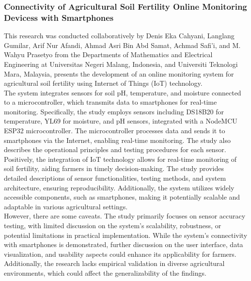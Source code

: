 \documentclass[12pt, a4paper]{article}
\begin{document}
\subsubsection{Connectivity of Agricultural Soil Fertility Online Monitoring Devicess with Smartphones}
This research was conducted collaboratively by Denis Eka Cahyani, Langlang Gumilar, Arif Nur Afandi, Ahmad Asri Bin Abd Samat, Achmad Safi'i, and M. Wahyu Prasetyo \cite{cahyani2023connectivity} from the Departments of Mathematics and Electrical Engineering at Universitas Negeri Malang, Indonesia, and Universiti Teknologi Mara, Malaysia, presents the development of an online monitoring system for agricultural soil fertility using Internet of Things (IoT) technology.\\
The system integrates sensors for soil pH, temperature, and moisture connected to a microcontroller, which transmits data to smartphones for real-time monitoring. Specifically, the study employs sensors including DS18B20 for temperature, YL69 for moisture, and pH sensors, integrated with a NodeMCU ESP32 microcontroller. The microcontroller processes data and sends it to smartphones via the Internet, enabling real-time monitoring. The study also describes the operational principles and testing procedures for each sensor.\\
Positively, the integration of IoT technology allows for real-time monitoring of soil fertility, aiding farmers in timely decision-making. The study provides detailed descriptions of sensor functionalities, testing methods, and system architecture, ensuring reproducibility. Additionally, the system utilizes widely accessible components, such as smartphones, making it potentially scalable and adaptable in various agricultural settings.\\
However, there are some caveats. The study primarily focuses on sensor accuracy testing, with limited discussion on the system's scalability, robustness, or potential limitations in practical implementation. While the system's connectivity with smartphones is demonstrated, further discussion on the user interface, data visualization, and usability aspects could enhance its applicability for farmers. Additionally, the research lacks empirical validation in diverse agricultural environments, which could affect the generalizability of the findings.
\end{document}
